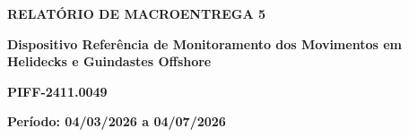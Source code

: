 \begin{center}
    \LARGE
    \textbf{RELATÓRIO DE MACROENTREGA 5}

    \vspace{0.6cm}
    \normalsize

    \begin{minipage}{.90\linewidth}
        \centering
        \textbf{
            Dispositivo Referência de Monitoramento dos Movimentos em Helidecks e Guindastes Offshore
        }
    
        \vspace{.6cm}
        \textbf{PIFF-2411.0049}
        \normalsize
    \end{minipage}
    
    \vspace{1.2cm}
    
    \begin{flushleft}
     \phantom{a.}\textbf{Período: 04/03/2026 a 04/07/2026}
    \end{flushleft}
    

\end{center}
